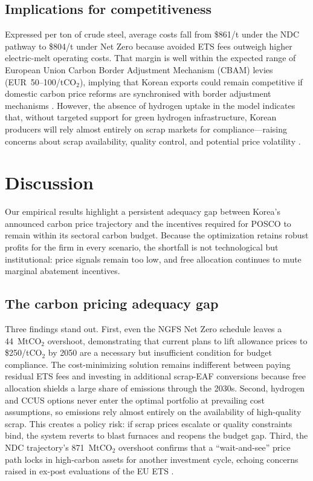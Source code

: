\documentclass[preprint,1p,authoryear]{elsarticle}
\begin{document}
\subsection{Implications for competitiveness}

Expressed per ton of crude steel, average costs fall from \$861/t under the NDC pathway to \$804/t under Net Zero because avoided ETS fees outweigh higher electric-melt operating costs. That margin is well within the expected range of European Union Carbon Border Adjustment Mechanism (CBAM) levies (EUR~50--100/tCO$_2$), implying that Korean exports could remain competitive if domestic carbon price reforms are synchronised with border adjustment mechanisms \citep{Vogl2018}. However, the absence of hydrogen uptake in the model indicates that, without targeted support for green hydrogen infrastructure, Korean producers will rely almost entirely on scrap markets for compliance—raising concerns about scrap availability, quality control, and potential price volatility \citep{Griffin2020}.

\section{Discussion}

Our empirical results highlight a persistent adequacy gap between Korea's announced carbon price trajectory and the incentives required for POSCO to remain within its sectoral carbon budget. Because the optimization retains robust profits for the firm in every scenario, the shortfall is not technological but institutional: price signals remain too low, and free allocation continues to mute marginal abatement incentives.

\subsection{The carbon pricing adequacy gap}

Three findings stand out. First, even the NGFS Net Zero schedule leaves a 44~MtCO$_2$ overshoot, demonstrating that current plans to lift allowance prices to \$250/tCO$_2$ by 2050 are a necessary but insufficient condition for budget compliance. The cost-minimizing solution remains indifferent between paying residual ETS fees and investing in additional scrap-EAF conversions because free allocation shields a large share of emissions through the 2030s. Second, hydrogen and CCUS options never enter the optimal portfolio at prevailing cost assumptions, so emissions rely almost entirely on the availability of high-quality scrap. This creates a policy risk: if scrap prices escalate or quality constraints bind, the system reverts to blast furnaces and reopens the budget gap. Third, the NDC trajectory's 871~MtCO$_2$ overshoot confirms that a “wait-and-see” price path locks in high-carbon assets for another investment cycle, echoing concerns raised in ex-post evaluations of the EU ETS \citep{Green2021, martin2016industry}.
\end{document}
